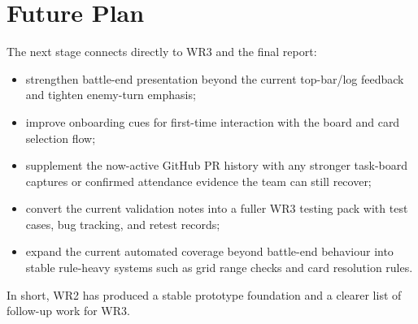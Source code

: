 \FloatBarrier

\section{Future Plan}

The next stage connects directly to WR3 and the final report:

\begin{itemize}
\item strengthen battle-end presentation beyond the current top-bar/log feedback and tighten enemy-turn emphasis;
\item improve onboarding cues for first-time interaction with the board and card selection flow;
\item supplement the now-active GitHub PR history with any stronger task-board captures or confirmed attendance evidence the team can still recover;
\item convert the current validation notes into a fuller WR3 testing pack with test cases, bug tracking, and retest records;
\item expand the current automated coverage beyond battle-end behaviour into stable rule-heavy systems such as grid range checks and card resolution rules.
\end{itemize}

In short, WR2 has produced a stable prototype foundation and a clearer list of follow-up work for WR3.
